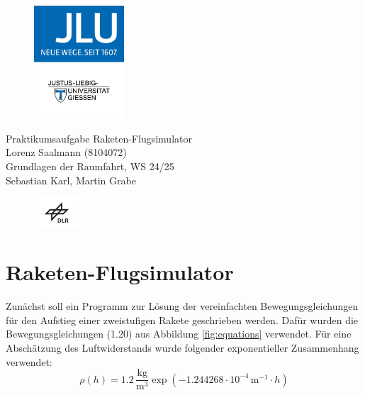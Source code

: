 \documentclass[12pt]{article}
\begin{document}
\setlength{\parindent}{0pt}


\begin{titlepage}
    \centering
    \begin{figure}
        \centering
        \includegraphics[width=0.3\textwidth]{images/jlu_logo.jpeg}
    \end{figure}
    \vspace*{2cm}
    \Large{Praktikumsaufgabe Raketen-Flugsimulator} \\
    \vspace{2cm}
    \normalsize{Lorenz Saalmann (8104072)} \\
    \vfill
    \normalsize{{Grundlagen der Raumfahrt, WS 24/25}} \\
    \small{Sebastian Karl, Martin Grabe} \\
    \begin{figure}[h]
        \centering
        \includegraphics[width=0.15\textwidth]{images/DLR_logo.png}
    \end{figure}
\end{titlepage}

\newpage

\section{Raketen-Flugsimulator}
Zunächst soll ein Programm zur Lösung der vereinfachten Bewegungsgleichungen für den Aufstieg einer zweistufigen Rakete geschrieben werden. Dafür wurden die Bewegungsgleichungen (1.20) aus Abbildung \ref{fig:equations} verwendet. Für eine Abschätzung des Luftwiderstands wurde folgender exponentieller Zusammenhang verwendet:
\begin{equation}
    \rho(h) = 1.2 \, \frac{\text{kg}}{\text{m}^3} \exp \left( -1.244268 \cdot 10^{-4} \, \text{m}^{-1} \cdot h \right)
\end{equation}
\end{document}
